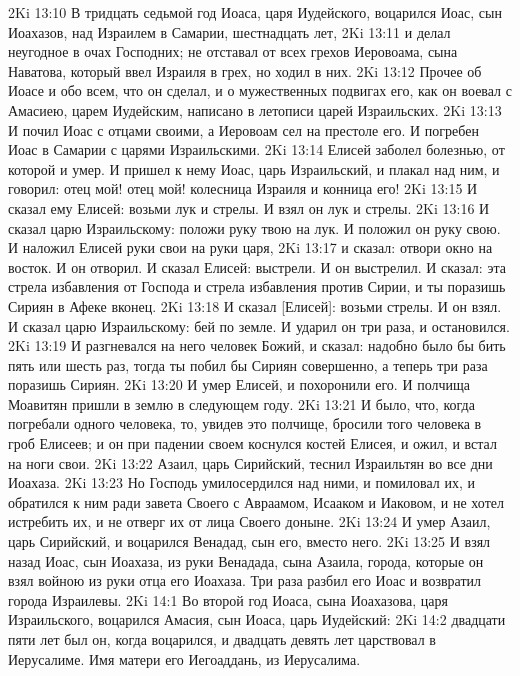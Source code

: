 \rsbpar\vs 2Ki 13:10 В тридцать седьмой год Иоаса, царя Иудейского, воцарился Иоас, сын Иоахазов, над Израилем в Самарии,  шестнадцать лет,
\vs 2Ki 13:11 и делал неугодное в очах Господних; не отставал от всех грехов Иеровоама, сына Наватова, который ввел Израиля в грех, но ходил в них.
\rsbpar\vs 2Ki 13:12 Прочее об Иоасе и обо всем, что он сделал, и о мужественных подвигах его, как он воевал с Амасиею, царем Иудейским, написано в летописи царей Израильских.
\vs 2Ki 13:13 И почил Иоас с отцами своими, а Иеровоам сел на престоле его. И погребен Иоас в Самарии с царями Израильскими.
\rsbpar\vs 2Ki 13:14 Елисей заболел болезнью, от которой  и умер. И пришел к нему Иоас, царь Израильский, и плакал над ним, и говорил: отец мой! отец мой! колесница Израиля и конница его!
\vs 2Ki 13:15 И сказал ему Елисей: возьми лук и стрелы. И взял он лук и стрелы.
\vs 2Ki 13:16 И сказал царю Израильскому: положи руку твою на лук. И положил он руку свою. И наложил Елисей руки свои на руки царя,
\vs 2Ki 13:17 и сказал: отвори окно на восток. И он отворил. И сказал Елисей: выстрели. И он выстрелил. И сказал: эта стрела избавления от Господа и стрела избавления против Сирии, и ты поразишь Сириян в Афеке вконец.
\vs 2Ki 13:18 И сказал [Елисей]: возьми стрелы. И он взял. И сказал царю Израильскому: бей по земле. И ударил он три раза, и остановился.
\vs 2Ki 13:19 И разгневался на него человек Божий, и сказал: надобно было бы бить пять или шесть раз, тогда ты побил бы Сириян совершенно, а теперь  три раза поразишь Сириян.
\vs 2Ki 13:20 И умер Елисей, и похоронили его. И полчища Моавитян пришли в землю в следующем году.
\vs 2Ki 13:21 И было, что, когда погребали одного человека, то, увидев это полчище,  бросили того человека в гроб Елисеев; и он при падении своем коснулся костей Елисея, и ожил, и встал на ноги свои.
\rsbpar\vs 2Ki 13:22 Азаил, царь Сирийский, теснил Израильтян во все дни Иоахаза.
\vs 2Ki 13:23 Но Господь умилосердился над ними, и помиловал их, и обратился к ним ради завета Своего с Авраамом, Исааком и Иаковом, и не хотел истребить их, и не отверг их от лица Своего доныне.
\vs 2Ki 13:24 И умер Азаил, царь Сирийский, и воцарился Венадад, сын его, вместо него.
\vs 2Ki 13:25 И взял назад Иоас, сын Иоахаза, из руки Венадада, сына Азаила, города, которые он взял войною из руки отца его Иоахаза. Три раза разбил его Иоас и возвратил города Израилевы.
\vs 2Ki 14:1 Во второй год Иоаса, сына Иоахазова, царя Израильского, воцарился Амасия, сын Иоаса, царь Иудейский:
\vs 2Ki 14:2 двадцати пяти лет был он, когда воцарился, и двадцать девять лет царствовал в Иерусалиме. Имя матери его Иегоаддань, из Иерусалима.
